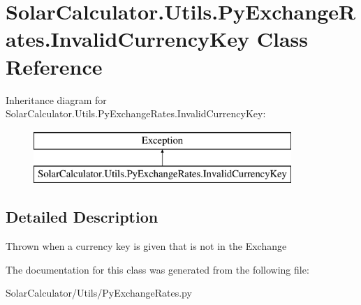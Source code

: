 \hypertarget{class_solar_calculator_1_1_utils_1_1_py_exchange_rates_1_1_invalid_currency_key}{\section{Solar\-Calculator.\-Utils.\-Py\-Exchange\-Rates.\-Invalid\-Currency\-Key Class Reference}
\label{class_solar_calculator_1_1_utils_1_1_py_exchange_rates_1_1_invalid_currency_key}
}
Inheritance diagram for Solar\-Calculator.\-Utils.\-Py\-Exchange\-Rates.\-Invalid\-Currency\-Key\-:\begin{figure}[H]
\begin{center}
\leavevmode
\includegraphics[height=2.000000cm]{class_solar_calculator_1_1_utils_1_1_py_exchange_rates_1_1_invalid_currency_key}
\end{center}
\end{figure}


\subsection{Detailed Description}
\begin{DoxyVerb}Thrown when a currency key is given that is not in the Exchange \end{DoxyVerb}
 

The documentation for this class was generated from the following file\-:\begin{DoxyCompactItemize}
\item 
Solar\-Calculator/\-Utils/Py\-Exchange\-Rates.\-py\end{DoxyCompactItemize}

